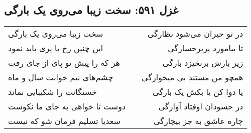 \begin{center}
\section*{غزل ۵۹۱: سخت زیبا می‌روی یک بارگی}
\label{sec:591}
\begin{longtable}{l p{0.5cm} r}
سخت زیبا می‌روی یک بارگی
&&
در تو حیران می‌شود نظارگی
\\
این چنین رخ با پری باید نمود
&&
تا بیاموزد پریرخسارگی
\\
هر که را پیش تو پای از جای رفت
&&
زیر بارش برنخیزد بارگی
\\
چشم‌های نیم خوابت سال و ماه
&&
همچو من مستند بی میخوارگی
\\
خستگانت را شکیبایی نماند
&&
یا دوا کن یا بکش یک بارگی
\\
دوست تا خواهی به جای ما نکوست
&&
در حسودان اوفتاد آوارگی
\\
سعدیا تسلیم فرمان شو که نیست
&&
چاره عاشق به جز بیچارگی
\\
\end{longtable}
\end{center}
